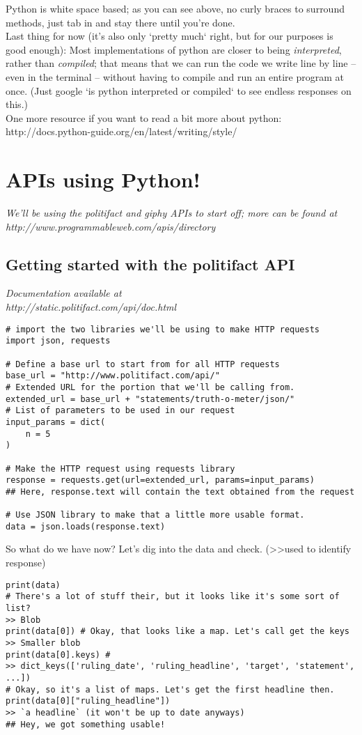 \documentclass{article}
\begin{document}
Python is white space based; as you can see above, no curly braces to surround methods, just tab in and stay there until you're done.\\

Last thing for now (it's also only `pretty much` right, but for our purposes is good enough): Most implementations of python are closer to being \textit{interpreted}, rather than \textit{compiled}; that means that we can run the code we write line by line -- even in the terminal -- without having to compile and run an entire program at once. (Just google `is python interpreted or compiled` to see endless responses on this.)\\
One more resource if you want to read a bit more about python:\\
http://docs.python-guide.org/en/latest/writing/style/

\pagebreak


\section{APIs using Python!}
\textit{We'll be using the politifact and giphy APIs to start off; more can be found at \\http://www.programmableweb.com/apis/directory}
\subsection{Getting started with the politifact API}
\textit{Documentation available at\\http://static.politifact.com/api/doc.html}
\begin{verbatim}
# import the two libraries we'll be using to make HTTP requests
import json, requests

# Define a base url to start from for all HTTP requests
base_url = "http://www.politifact.com/api/"
# Extended URL for the portion that we'll be calling from.
extended_url = base_url + "statements/truth-o-meter/json/"
# List of parameters to be used in our request
input_params = dict(
    n = 5
)

# Make the HTTP request using requests library
response = requests.get(url=extended_url, params=input_params)
## Here, response.text will contain the text obtained from the request

# Use JSON library to make that a little more usable format.
data = json.loads(response.text)
\end{verbatim}

So what do we have now? Let's dig into the data and check. (\textgreater\textgreater used to identify response)
\begin{verbatim}
print(data) 
# There's a lot of stuff their, but it looks like it's some sort of list?
>> Blob
print(data[0]) # Okay, that looks like a map. Let's call get the keys
>> Smaller blob
print(data[0].keys) #
>> dict_keys(['ruling_date', 'ruling_headline', 'target', 'statement', ...])
# Okay, so it's a list of maps. Let's get the first headline then.
print(data[0]["ruling_headline"])
>> `a headline` (it won't be up to date anyways)
## Hey, we got something usable!
\end{verbatim}
\end{document}
